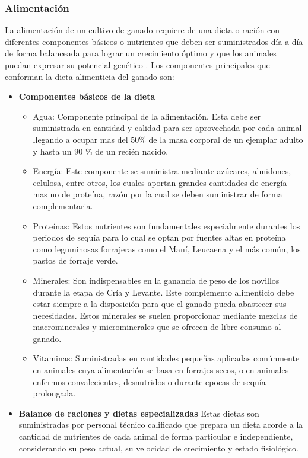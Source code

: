 

\subsubsection{Alimentación}
La alimentación de un cultivo de ganado requiere de una dieta o ración con diferentes componentes básicos o nutrientes que deben ser suministrados día a día de forma balanceada para lograr un crecimiento óptimo y que los animales puedan expresar su potencial genético \cite{recomendaciones}. Los componentes principales que conforman la dieta alimenticia del ganado son:
	\begin{itemize}
	\item \textbf{Componentes básicos de la dieta} %
		\begin{itemize}
		\item Agua: Componente principal de la alimentación. Esta debe ser suministrada en cantidad y calidad para ser aprovechada por cada animal llegando a ocupar mas del 50\% de la masa corporal de un ejemplar adulto y hasta un 90 \% de un recién nacido.
		\item Energía:  Este componente se suministra mediante azúcares, almidones, celulosa, entre otros, los cuales aportan grandes cantidades de energía mas no de proteína, razón por la cual se deben suministrar de forma complementaria.
		\item Proteínas: Estos nutrientes son fundamentales especialmente durantes los periodos de sequía para lo cual se optan por fuentes altas en proteína como leguminosas forrajeras como el Maní, Leucaena y el más común, los pastos de forraje verde. 
		\item Minerales: Son indispensables en la ganancia de peso de los novillos durante la etapa de Cría y Levante. Este complemento alimenticio debe estar siempre a la disposición para que el ganado pueda abastecer sus necesidades. Estos minerales se suelen proporcionar mediante mezclas de macrominerales y microminerales que se ofrecen de libre consumo al ganado.
		\item Vitaminas: Suministradas en cantidades pequeñas aplicadas comúnmente en animales cuya alimentación se basa en forrajes secos,  o en animales enfermos convalecientes, desnutridos o durante epocas de sequía prolongada.
		\end{itemize}
	\item \textbf{Balance de raciones y dietas especializadas} %
Estas dietas son suministradas por personal técnico calificado que prepara un dieta acorde a la cantidad de nutrientes de cada animal de forma particular e independiente, considerando su peso actual, su velocidad de crecimiento y estado fisiológico.
	\end{itemize}
	
